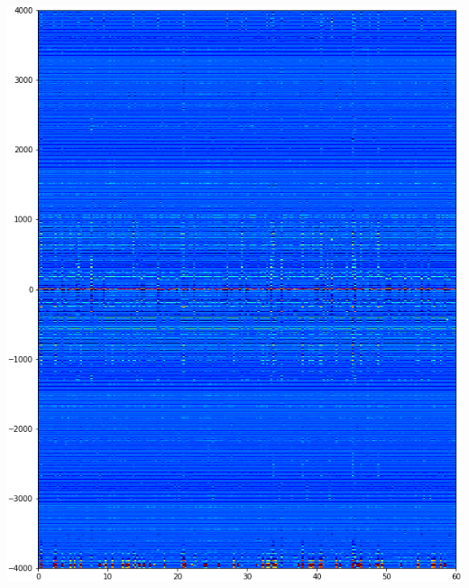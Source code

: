 \documentclass[a0,portrait]{a0poster}
\begin{document}
\begin{multicols}{2}
\begin{tcolorbox}[colback=blue!5!white,colframe=blue!75!black,title,title={\section*{Résultats}}]
\newcommand{\centeredmark}[1]{\centerline{\tikzmark{#1}}}
\begin{minipage}{0.2\textwidth}
    \includegraphics[width=1.0\textwidth]{./iter=20000.png}
    \centeredmark{a}
\end{minipage}%
\begin{minipage}{0.2\textwidth}

\end{minipage}
\end{tcolorbox}
\end{multicols}
\end{document}
